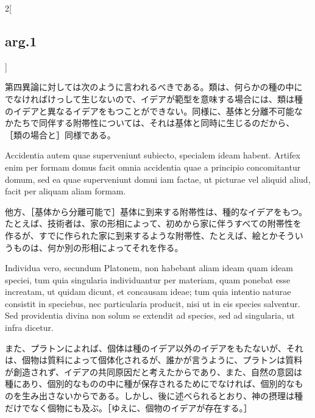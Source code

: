 \documentclass[paper=a4paper,fontsize=10pt,jafontsize=9pt,titlepage]{jlreq}
\begin{document}
\begin{paracol}{2}[\subsection{arg.1}]
\switchcolumn

第四異論に対しては次のように言われるべきである。類は、何らかの種の中に
でなければけっして生じないので、イデアが範型を意味する場合には、類は種
のイデアと異なるイデアをもつことができない。同様に、基体と分離不可能な
かたちで同伴する附帯性については、それは基体と同時に生じるのだから、
［類の場合と］同様である。

\switchcolumn*

Accidentia autem quae superveniunt subiecto, specialem ideam
habent. Artifex enim per formam domus facit omnia accidentia quae a
principio concomitantur domum, sed ea quae superveniunt domui iam
factae, ut picturae vel aliquid aliud, facit per aliquam aliam formam.

\switchcolumn

他方、［基体から分離可能で］基体に到来する附帯性は、種的なイデアをもつ。
たとえば、技術者は、家の形相によって、初めから家に伴うすべての附帯性を
作るが、すでに作られた家に到来するような附帯性、たとえば、絵とかそうい
うものは、何か別の形相によってそれを作る。

\switchcolumn*

Individua vero, secundum Platonem, non habebant aliam ideam quam ideam
speciei, tum quia singularia individuantur per materiam, quam ponebat
esse increatam, ut quidam dicunt, et concausam ideae; tum quia
intentio naturae consistit in speciebus, nec particularia producit,
nisi ut in eis species salventur. Sed providentia divina non solum se
extendit ad species, sed ad singularia, ut infra dicetur.

\switchcolumn

また、プラトンによれば、個体は種のイデア以外のイデアをもたないが、それ
は、個物は質料によって個体化されるが、誰かが言うように、プラトンは質料
が創造されず、イデアの共同原因だと考えたからであり、また、自然の意図は
種にあり、個別的なものの中に種が保存されるためにでなければ、個別的なも
のを生み出さないからである。しかし、後に述べられるとおり、神の摂理は種
だけでなく個物にも及ぶ。［ゆえに、個物のイデアが存在する。］

\end{paracol}
\end{document}
